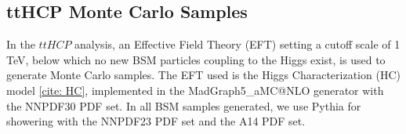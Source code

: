 \begin{table}[h!]
  \centering
\caption{Summary of nominal background samples}
\label{tab:bckg_samples}
\end{table}  

\subsection{ttHCP Monte Carlo Samples} \label{sec:ttHCPMC} 

In the $ttH CP$ analysis, an Effective Field Theory (EFT) setting a cutoff scale of 1 TeV, below which no new BSM particles coupling to the Higgs exist, is used to generate Monte Carlo samples. The EFT used is the Higgs Characterization (HC) model \ref{cite: HC}, implemented in the MadGraph5\_aMC@NLO generator with the NNPDF30 PDF set. In all BSM samples generated, we use Pythia for showering with the NNPDF23 PDF set and the A14 PDF set.

